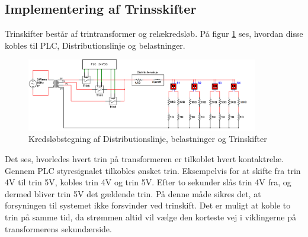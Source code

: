 \subsection{Implementering af Trinsskifter}

Trinskifter består af trintransformer og relækredsløb. På figur \ref{fig:Trinskift} ses, hvordan disse kobles til PLC, Distributionslinje og belastninger.

\begin{figure}[H]
	\centering
	\includegraphics[width=0.9\textwidth]{figure/Trinskiftertegning2}
	\caption{Kredsløbstegning af Distributionslinje, belastninger og Trinskifter}
	\label{fig:Trinskift}
\end{figure}

Det ses, hvorledes hvert trin på transformeren er tilkoblet hvert kontaktrelæ. Gennem PLC styresignalet tilkobles ønsket trin. Eksempelvis for at skifte fra trin 4V til trin 5V, kobles trin 4V og trin 5V. Efter to sekunder slås trin 4V fra, og dermed bliver trin 5V det gældende trin. På denne måde sikres det, at forsyningen til systemet ikke forsvinder ved trinskift. Det er muligt at koble to trin på samme tid, da strømmen altid vil vælge den korteste vej i viklingerne på transformerens sekundærside. 



